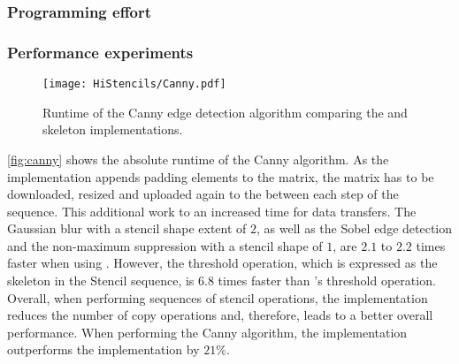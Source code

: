 \subsubsection*{Programming effort}

\subsubsection*{Performance experiments}

\begin{figure}[tbp]
	\centering
	\texttt{[image: HiStencils/Canny.pdf]}
	\caption{Runtime of the Canny edge detection algorithm comparing the  and  skeleton implementations.}
	\label{fig:canny}
\end{figure} 

\autoref{fig:canny} shows the absolute runtime of the Canny algorithm. 
As the  implementation appends padding elements to the matrix, the matrix has to be downloaded, resized and uploaded again to the \GPU between each step of the sequence.
This additional work to an increased time for data transfers. 
The Gaussian blur with a stencil shape extent of $2$, as well as the Sobel edge detection and the non-maximum suppression with a stencil shape of $1$, are $2.1$ to $2.2$ times faster when using . 
However, the threshold operation, which is expressed as the \map skeleton in the Stencil sequence, is $6.8$ times faster than 's threshold operation.
Overall, when performing sequences of stencil operations, the  implementation reduces the number of copy operations and, therefore, leads to a better overall performance.
When performing the Canny algorithm, the  implementation outperforms the  implementation by $21\%$.

